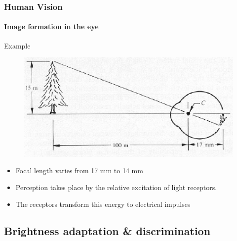 \documentclass[table]{beamer}
\begin{document}
\begin{frame}
  \frametitle{Human Vision}
  \framesubtitle{Image formation in the eye}
  \begin{block}{Example}
    \begin{figure}
      \centering
      \includegraphics[width=.7\textwidth]{./images/form.png}
    \end{figure}
    \begin{itemize}\scriptsize
    \item Focal length varies from 17 mm to 14 mm
    \item Perception takes place by the relative excitation of light receptors.
    \item The receptors transform this energy to electrical impulses
    \end{itemize}
  \end{block}
\end{frame}

\subsection{Brightness adaptation \& discrimination}
\end{document}

